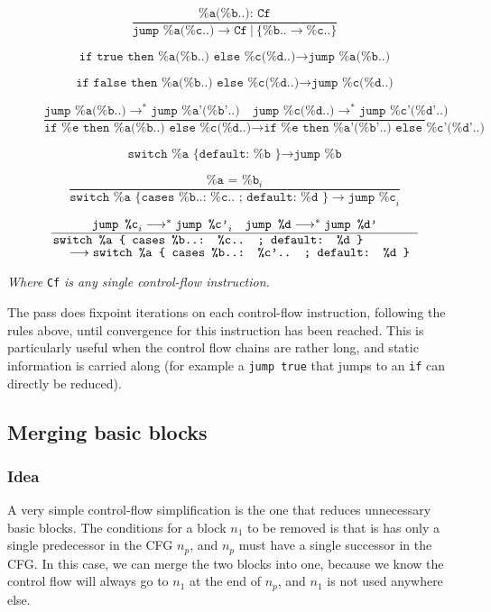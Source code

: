 \documentclass[12pt,a4paper]{article}
\newcommand{\nir}[1]{\texttt{#1}}
\begin{document}
\begin{figure}
$$ \frac{\nir{\%a(\%b..): Cf}}{\nir{jump \%a(\%c..)} \longrightarrow \nir{Cf} \  | \  \{\nir{\%b..} \rightarrow \nir{\%c..}\}} $$

$$ \nir{if true then \%a(\%b..) else \%c(\%d..)} \longrightarrow \nir{jump \%a(\%b..)} $$

$$ \nir{if false then \%a(\%b..) else \%c(\%d..)} \longrightarrow \nir{jump \%c(\%d..)} $$

$$ \frac{\nir{jump \%a(\%b..)} \longrightarrow^* \nir{jump \%a'(\%b'..)} \quad \nir{jump \%c(\%d..)} \longrightarrow^* \nir{jump \%c'(\%d'..)}}{\nir{if \%e then \%a(\%b..) else \%c(\%d..)} \longrightarrow \nir{if \%e then \%a'(\%b'..) else \%c'(\%d'..)}} $$

$$ \nir{switch \%a \{ default: \%b \} } \longrightarrow \nir{jump \%b} $$

$$ \frac{\nir{\%a = \%b}_i}{\nir{switch \%a \{ cases \%b..: \%c.. ; default: \%d \} } \longrightarrow \nir{jump \%c}_i} $$

$$ \frac{\nir{jump \%c}_i \longrightarrow^* \nir{jump \%c'}_i \quad \nir{jump \%d} \longrightarrow^* \nir{jump \%d'}}{\splitfrac{\nir{switch \%a \{ cases \%b..: \%c.. ; default: \%d \} }}{\longrightarrow \nir{switch \%a \{ cases \%b..: \%c'.. ; default: \%d \} }}} $$
\centering
\end{figure}
\hspace{2mm}

\textit{Where} \nir{Cf} \textit{is any single control-flow instruction.}

\hspace{2mm}

The pass does fixpoint iterations on each control-flow instruction, following the rules above, until convergence for this instruction has been reached. This is particularly useful when the control flow chains are rather long, and static information is carried along (for example a \nir{jump true} that jumps to an \nir{if} can directly be reduced).

\subsection{Merging basic blocks}

\subsubsection*{Idea}

A very simple control-flow simplification is the one that reduces unnecessary basic blocks. The conditions for a block $n_1$ to be removed is that is has only a single predecessor in the CFG $n_p$, and $n_p$ must have a single successor in the CFG. In this case, we can merge the two blocks into one, because we know the control flow will always go to $n_1$ at the end of $n_p$, and $n_1$ is not used anywhere else.
\end{document}
